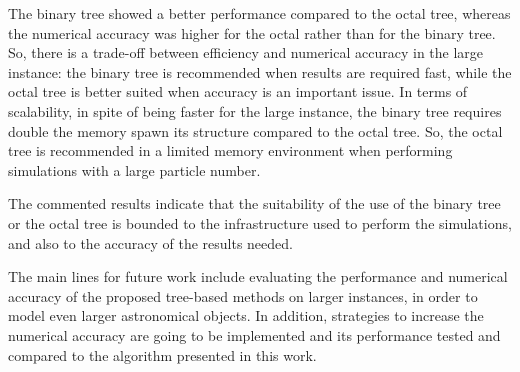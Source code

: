 \documentclass[runningheads]{llncs}
\begin{document}
The binary tree showed a better performance compared to the octal tree, whereas the numerical accuracy was higher for the octal rather than for the binary tree. So, there is a trade-off between efficiency and numerical accuracy in the large instance: the binary tree is recommended when results are required fast, while the octal tree is better suited when accuracy is an important issue.
%
In terms of scalability, in spite of being faster for the large instance, the binary tree requires double the memory spawn its structure compared to the octal tree. So, the octal tree is recommended in a limited memory environment when performing simulations with a large particle number. 

The commented results indicate that the suitability of the use of the binary tree or the octal tree is bounded to the infrastructure  used to perform the simulations, and also to the accuracy of the results needed. 

The main lines for future work include evaluating 
the performance and numerical accuracy of the proposed tree-based methods on
larger instances, in order to model even larger astronomical objects. 
In addition, strategies to increase the numerical accuracy are going to be implemented and its performance tested and compared to the algorithm presented in this work.



\end{document}
